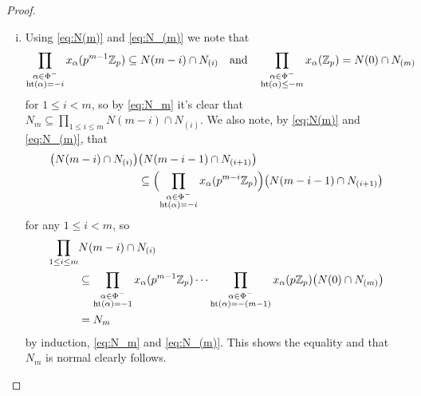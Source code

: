 \begin{proof}
  \begin{enumerate}[(i),wide]
  \item Using \eqref{eq:N(m)} and \eqref{eq:N_(m)} we note that
    \begin{equation*}
      \prod_{\substack{\alpha\in \Phi^{-} \\ \operatorname{ht}(\alpha) = -i}} x_\alpha(p^{m-1} \mathbb{Z}_p) \subseteq N(m-i) \cap N_{(i)} \quad \text{and} \quad \prod_{\substack{\alpha\in \Phi^{-} \\ \operatorname{ht}(\alpha) \leq -m}} x_\alpha(\mathbb{Z}_p) = N(0) \cap N_{(m)}
    \end{equation*}
    for $1 \leq i < m$, so by \eqref{eq:N_m} it's clear that $N_m \subseteq \prod_{1 \leq i \leq m} N(m-i) \cap N_{(i)}$. We also note, by \eqref{eq:N(m)} and \eqref{eq:N_(m)}, that
    \begin{align*}
      \bigl( N(m-i) \cap N_{(i)} \bigr)&\bigl( N(m-i-1) \cap N_{(i+1)} \bigr) \\
      &\subseteq \Bigl( \prod_{\substack{\alpha\in \Phi^{-} \\ \operatorname{ht}(\alpha) = -i}} x_\alpha(p^{m-i} \mathbb{Z}_p) \Bigr)\bigl( N(m-i-1) \cap N_{(i+1)} \bigr)
    \end{align*}
    for any $1 \leq i < m$, so
    \begin{align*}
      \prod_{1 \leq i \leq m} &N(m-i) \cap N_{(i)} \\
                    &\subseteq \prod_{\substack{\alpha\in \Phi^{-} \\ \operatorname{ht}(\alpha) = -1}} x_\alpha(p^{m-1} \mathbb{Z}_p) \dotsb \prod_{\substack{\alpha\in \Phi^{-} \\ \operatorname{ht}(\alpha) = -(m-1)}} x_\alpha(p \mathbb{Z}_p) \bigl( N(0) \cap N_{(m)} \bigr) \\
      &= N_m
    \end{align*}
    by induction, \eqref{eq:N_m} and \eqref{eq:N_(m)}. This shows the equality and that $N_m$ is normal clearly follows.


\end{enumerate}
\end{proof}

